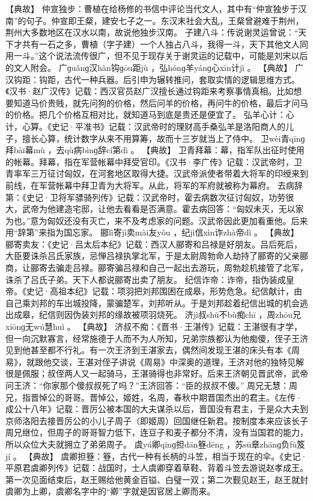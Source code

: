 \documentclass[12pt,UTF8]{ctexbook}
\begin{document}
【典故】
仲宣独步：曹植在给杨修的书信中评论当代文人，其中有“仲宣独步于汉南”的句子。仲宣即王粲，建安七子之一。东汉末社会大乱，王粲曾避难于荆州，荆州大多数地区在汉水以南，故说他独步汉南。
子建八斗：传说谢灵运曾说：“天下才共有一石之多，曹植（字子建）一个人独占八斗，我得一斗，天下其他文人同用一斗。”这个说法流传很广，但不见于现存关于谢灵运的记载中，可能是刘宋以后的文人附会。
广ɡuǎnɡ汉hàn钩ɡōu距jù
，弘hónɡ羊yánɡ心xīn计jì
。
【典故】
广汉钩距：钩距，古代一种兵器。后引申为辗转推问，套取实情的逻辑思维方式。《汉书·赵广汉传》记载：西汉官员赵广汉擅长通过钩距来考察事情真相。比如想要知道马价贵贱，就先问狗的价格，然后问羊的价格，再问牛的价格，最后才问马的价格。把几个价格互相对比，就知道马到底是贵还是便宜了。
弘羊心计：心计，心算。《史记·平准书》记载：汉武帝时的理财高手桑弘羊是洛阳商人的儿子，擅长心算，统计数字从来不用算筹，故而十三岁就当上了侍中。
卫wèi青qīnɡ拜bài幕mù
，去qù病bìnɡ辞cí第dì
。
【典故】
卫青拜幕：幕，指军队出征时使用的帐幕。拜幕，指在军营帐幕中拜受官印。《汉书·李广传》记载：汉武帝时，卫青率军三万征讨匈奴，在河套地区取得大捷。汉武帝派使者带着大将军的印绶来到前线，在军营帐幕中拜卫青为大将军。从此，将军的军府就被称为幕府。
去病辞第：《史记·卫将军骠骑列传》记载：汉武帝时，霍去病数次征讨匈奴，功劳很大，武帝为他建造宅邸，让他去看看是否满意。霍去病回答：“匈奴未灭，无以家为也。”意为匈奴还没有灭亡，来不及考虑家的问题。汉武帝因此更加看重他。后来用“辞第”来指为国忘家。
郦lì寄jì卖mài友yǒu
，纪jì信xìn诈zhà帝dì
。
【典故】
郦寄卖友：《史记·吕太后本纪》记载：西汉人郦寄和吕禄是好朋友。吕后死后，大臣要诛杀吕氏家族，忌惮吕禄执掌北军，于是太尉周勃命人劫持了郦寄的父亲郦商，让郦寄去骗走吕禄。郦寄骗吕禄和自己一起出去游玩，周勃趁机接管了北军，诛杀了吕氏子弟。天下人都说郦寄出卖了朋友。
纪信诈帝：诈帝，指伪装成皇帝。《史记·高祖本纪》记载：项羽把刘邦围困在成皋，形势危急。纪信献计，由自己乘刘邦的车出城投降，蒙骗楚军，刘邦听从。于是刘邦趁着纪信出城的机会逃出成皋，纪信则因伪装刘邦的缘故被项羽烧死。
济jì叔shū不bù痴chī
，周zhōu兄xiōnɡ无wú慧huì
。
【典故】
济叔不痴：《晋书·王湛传》记载：王湛很有才学，但一向沉默寡言，经常施德于人而不为人所知，兄弟宗族都认为他痴傻，侄子王济见到他甚至都不行礼。有一次王济到王湛家去，偶然间发现王湛的床头有本《周易》，就跟他交谈，王湛对侄子讲说《周易》中深奥的道理，王济对他的独特见解很是佩服；叔侄两人又一起骑马，王湛骑得也非常好。后来王济朝见晋武帝，武帝问王济：“你家那个傻叔叔死了吗？”王济回答：“臣的叔叔不傻。”
周兄无慧：周兄，指晋悼公的哥哥。晋悼公，姬姓，名周，春秋中期晋国杰出的君主。《左传·成公十八年》记载：晋厉公被本国的大夫谋杀以后，晋国没有君主，于是众大夫到京师洛阳去接晋厉公的小儿子周子（即姬周）回国继任新君。按制度本来应该长子周兄继位，但周子的哥哥智力低下，连豆子和麦子都分不清，没有当国君的能力，所以众位大夫就拥立了弟弟周子。
虞yú卿qīnɡ担dān簦dēng
，苏sū章zhānɡ负fù笈jí
。
【典故】
虞卿担簦：簦，古代一种有长柄的斗笠，相当于现在的伞。《史记·平原君虞卿列传》记载：战国时，士人虞卿穿着草鞋、背着斗笠去游说赵孝成王。第一次见面结束后，赵王赐给他黄金百镒、白璧一双；第二次觐见赵王，赵王就封虞卿为上卿，虞卿名字中的“卿”字就是因官居上卿而来。
\end{document}
